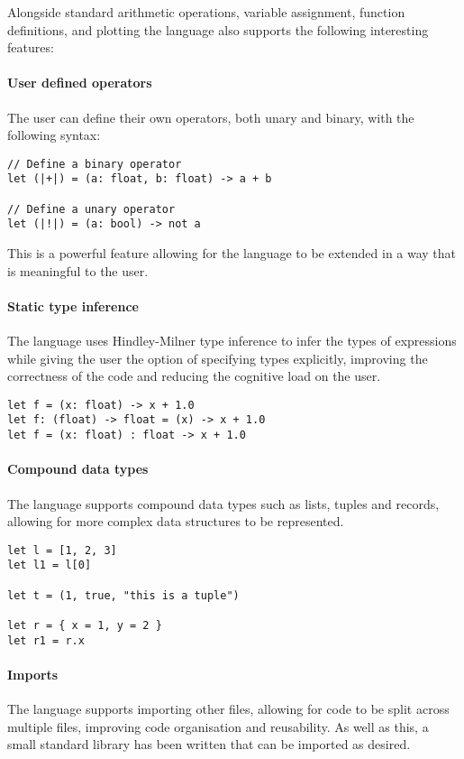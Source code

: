 Alongside standard arithmetic operations, variable assignment, function definitions, and plotting the language also 
supports the following interesting features:

\paragraph{User defined operators} The user can define their own operators, both unary and binary, with the 
following syntax:

\begin{verbatim}
// Define a binary operator
let (|+|) = (a: float, b: float) -> a + b

// Define a unary operator
let (|!|) = (a: bool) -> not a
\end{verbatim}

This is a powerful feature allowing for the language to be extended in a way that is meaningful to the user.

\paragraph{Static type inference} The language uses Hindley-Milner type inference to infer the types of
expressions while giving the user the option of specifying types explicitly, improving the correctness of the
code and reducing the cognitive load on the user.

\begin{verbatim}
let f = (x: float) -> x + 1.0
let f: (float) -> float = (x) -> x + 1.0
let f = (x: float) : float -> x + 1.0
\end{verbatim}

\paragraph{Compound data types} The language supports compound data types such as lists, tuples and records,
allowing for more complex data structures to be represented.

\begin{verbatim}
let l = [1, 2, 3]
let l1 = l[0]

let t = (1, true, "this is a tuple")

let r = { x = 1, y = 2 }
let r1 = r.x
\end{verbatim}

\paragraph{Imports} The language supports importing other files, allowing for code to be split across multiple
files, improving code organisation and reusability.
As well as this, a small standard library has been written that can be imported as desired.


